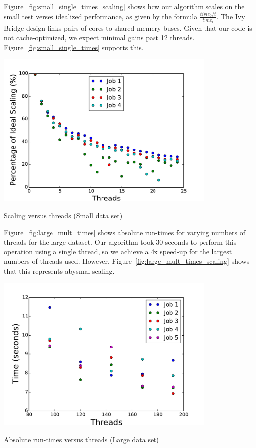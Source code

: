 \documentclass{article}
\begin{document}
Figure~\ref{fig:small_single_times_scaling} shows how our algorithm scales on the small test verses idealized performance, as given by the formula $\frac{time_0/t}{time_t}$. The Ivy Bridge design links pairs of cores to shared memory buses. Given that our code is not cache-optimized, we expect minimal gains past 12 threads. Figure~\ref{fig:small_single_times} supports this.

\begin{minipage}{\linewidth}
  \captionsetup{type=figure}
  \begin{center}
  \includegraphics[width=0.8\textwidth]{SingleScaling.pdf}
  \end{center}
  \caption{Scaling versus threads (Small data set)} \label{fig:small_single_times_scaling}
\end{minipage}

Figure~\ref{fig:large_mult_times} shows absolute run-times for varying numbers of threads for the large dataset. Our algorithm took 30 seconds to perform this operation using a single thread, so we achieve a 4x speed-up for the largest numbers of threads used. However, Figure~\ref{fig:large_mult_times_scaling} shows that this represents abysmal scaling.

\begin{minipage}{\linewidth}
  \captionsetup{type=figure}
  \begin{center}
  \includegraphics[width=0.8\textwidth]{LargeMultTime.pdf}
  \end{center}
  \caption{Absolute run-times versus threads (Large data set)} \label{fig:large_mult_times}
\end{minipage}
\end{document}
